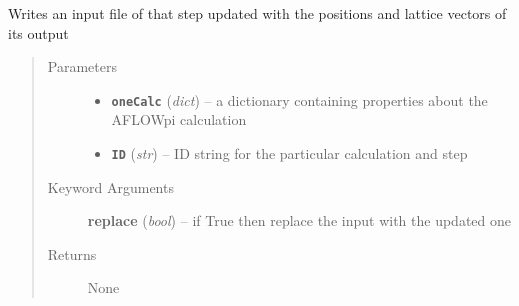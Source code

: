 \documentclass[letterpaper,10pt,english]{sphinxmanual}
\begin{document}

\begin{fulllineitems}
\label{retr:retr.__writeInputFromOutput}
Writes an input file of that step updated with the positions and lattice vectors of its output
\begin{quote}\begin{description}
\item[{Parameters}] \leavevmode\begin{itemize}
\item {} 
\textbf{\texttt{oneCalc}} (\emph{dict}) -- a dictionary containing properties about the AFLOWpi calculation

\item {} 
\textbf{\texttt{ID}} (\emph{str}) -- ID string for the particular calculation and step

\end{itemize}

\item[{Keyword Arguments}] \leavevmode
\textbf{replace} (\emph{bool}) --
if True then replace the input with the updated one

\item[{Returns}] \leavevmode
None

\end{description}\end{quote}

\end{fulllineitems}

\end{document}
